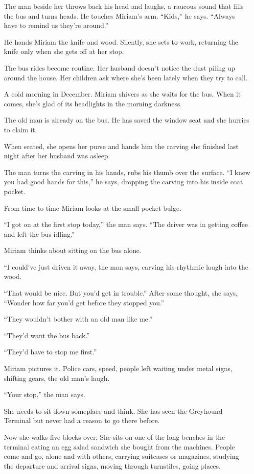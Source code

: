 \documentclass[
]{article}
\begin{document}
The man beside her throws back his head and laughs, a raucous sound that
fills the bus and turns heads. He touches Miriam's arm. ``Kids,'' he
says. ``Always have to remind us they're around.''

He hands Miriam the knife and wood. Silently, she sets to work,
returning the knife only when she gets off at her stop.

The bus rides become routine. Her husband doesn't notice the dust piling
up around the house. Her children ask where she's been lately when they
try to call.

A cold morning in December. Miriam shivers as she waits for the bus.
When it comes, she's glad of its headlights in the morning darkness.

The old man is already on the bus. He has saved the window seat and she
hurries to claim it.

When seated, she opens her purse and hands him the carving she finished
last night after her husband was asleep.

The man turns the carving in his hands, rubs his thumb over the surface.
``I knew you had good hands for this,'' he says, dropping the carving
into his inside coat pocket.

From time to time Miriam looks at the small pocket bulge.

``I got on at the first stop today,'' the man says. ``The driver was in
getting coffee and left the bus idling.''

Miriam thinks about sitting on the bus alone.

``I could've just driven it away, the man says, carving his rhythmic
laugh into the wood.

``That would be nice. But you'd get in trouble.'' After some thought,
she says, ``Wonder how far you'd get before they stopped you.''

``They wouldn't bother with an old man like me.''

``They'd want the bus back.''

``They'd have to stop me first.''

Miriam pictures it. Police cars, speed, people left waiting under metal
signs, shifting gears, the old man's laugh.

``Your stop,'' the man says.

She needs to sit down someplace and think. She has seen the Greyhound
Terminal but never had a reason to go there before.

Now she walks five blocks over. She sits on one of the long benches in
the terminal eating an egg salad sandwich she bought from the machines.
People come and go, alone and with others, carry­ing suitcases or
magazines, studying the departure and arrival signs, moving through
turnstiles, going places.
\end{document}
